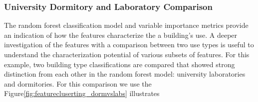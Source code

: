 \subsubsection{University Dormitory and Laboratory Comparison}
\label{sec:dormvslab}

The random forest classification model and variable importance metrics provide an indication of how the features characterize the a building's use. A deeper investigation of the features with a comparison between two use types is useful to understand the characterization potential of various subsets of features. For this example, two building type classifications are compared that showed strong distinction from each other in the random forest model: university laboratories and dormitories. For this comparison we use the Figure\ref{fig:featurecluserting_dormvslabs} illustrates